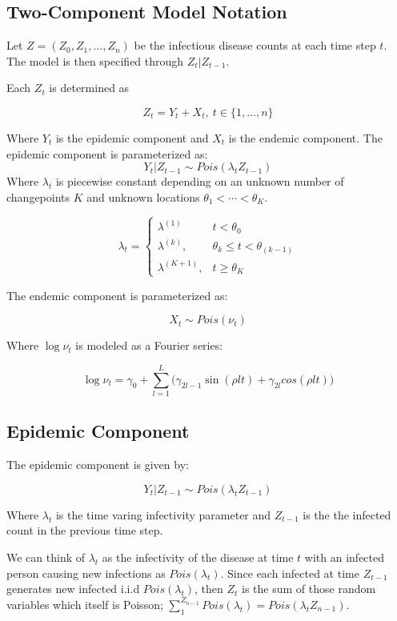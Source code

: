 \documentclass[]{article}
\numberwithin{equation}{section}
\begin{document}
\hypertarget{two-component-model-notation}{%
\subsection{Two-Component Model
Notation}\label{two-component-model-notation}}

Let \(Z = (Z_0, Z_1, ..., Z_n)\) be the infectious disease counts at
each time step \(t\). The model is then specified through
\(Z_t | Z_{t-1}\).

Each \(Z_t\) is determined as

\[ Z_t = Y_t + X_t,\ t\in\{1,\dots, n\}\]

Where \(Y_t\) is the epidemic component and \(X_t\) is the endemic
component. The epidemic component is parameterized as:
\[Y_t|Z_{t-1} \sim Pois(\lambda_tZ_{t-1})\] Where \(\lambda_t\) is
piecewise constant depending on an unknown number of changepoints \(K\)
and unknown locations \(\theta_1 < \cdots < \theta_K\).

\[ \lambda_t =  \begin{cases} \lambda^{(1)} & t < \theta_0 \\
\lambda^{(k)}, & \theta_{k} \leq t < \theta_{(k-1)} \\
\lambda^{(K+1)}, & t \geq \theta_K \end{cases}\]

The endemic component is parameterized as:

\[ X_t \sim Pois(\nu_t)\]

Where \(\log{\nu_t}\) is modeled as a Fourier series:

\[ \log{\nu_t} = \gamma_0 + \sum_{l = 1}^L \big(\gamma_{2l-1}\sin(\rho l t)+\gamma_{2l}cos(\rho l t)\big) \]

\hypertarget{epidemic-component}{%
\subsection{Epidemic Component}\label{epidemic-component}}

The epidemic component is given by:

\[Y_t|Z_{t-1} \sim Pois(\lambda_tZ_{t-1})\]

Where \(\lambda_t\) is the time varing infectivity parameter and
\(Z_{t-1}\) is the the infected count in the previous time step.

We can think of \(\lambda_t\) as the infectivity of the disease at time
\(t\) with an infected person causing new infections as
\(Pois(\lambda_t)\). Since each infected at time \(Z_{t-1}\) generates
new infected i.i.d \(Pois(\lambda_t)\), then \(Z_t\) is the sum of those
random variables which itself is Poisson;
\(\sum_1^{Z_{n-1}}Pois(\lambda_t) = Pois(\lambda_tZ_{n-1})\).
\end{document}
